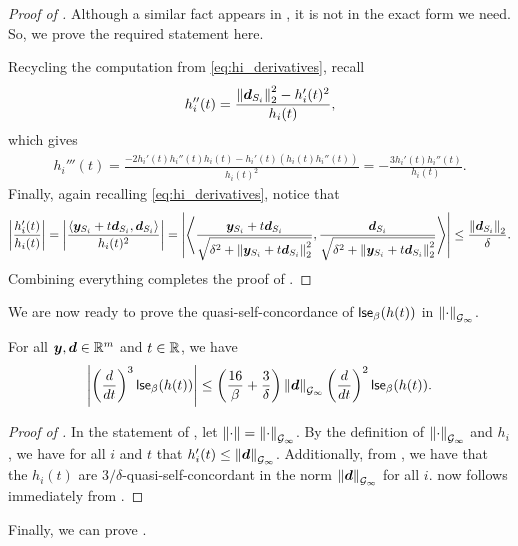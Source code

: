 \begin{proof}[Proof of ]
Although a similar fact appears in \cite[Section 2.1.2]{ob18}, it is not in the exact form we need. So, we prove the required statement here.

Recycling the computation from \eqref{eq:hi_derivatives}, recall
\begin{align*}
    h_i''(t) = \frac{\left\lVert \bm{d}_{S_i} \right\rVert_2^2 - h_i'(t)^2}{h_i(t)},
\end{align*}
which gives
\begin{align*}
    h_i'''(t) = \frac{-2h_i'(t)h_i''(t)h_i(t) - h_i'(t)(h_i(t)h_i''(t))}{h_i(t)^2} = -\frac{3h_i'(t)h_i''(t)}{h_i(t)}.
\end{align*}
Finally, again recalling \eqref{eq:hi_derivatives}, notice that
\begin{align*}
    \left\lvert \frac{h_i'(t)}{h_i(t)} \right\rvert = \left\lvert \frac{\left\langle \bm{y}_{S_i}+t\bm{d}_{S_i},\bm{d}_{S_i} \right\rangle}{h_i(t)^2} \right\rvert = \left\lvert \left\langle \frac{\bm{y}_{S_i}+t\bm{d}_{S_i}}{\sqrt{\delta^2+\left\lVert \bm{y}_{S_i}+t\bm{d}_{S_i} \right\rVert_2^2}}, \frac{\bm{d}_{S_i}}{\sqrt{\delta^2+\left\lVert \bm{y}_{S_i}+t\bm{d}_{S_i} \right\rVert_2^2}} \right\rangle \right\rvert \le \frac{\left\lVert \bm{d}_{S_i} \right\rVert_2}{\delta}.
\end{align*}
Combining everything completes the proof of .
\end{proof}
We are now ready to prove the quasi-self-concordance of $\mathsf{lse}_{\beta}(h(t))$ in $\left\lVert \cdot \right\rVert_{\mathcal{G}_{\infty}}$.
\begin{lemma}
\label{lemma:base_qsc}
For all $\bm{y}, \bm{d} \in \mathbb{R}^m$ and $t\in\mathbb{R}$, we have
\begin{align*}
    \left\lvert \left(\frac{d}{dt}\right)^3 \mathsf{lse}_{\beta}(h(t)) \right\rvert \le \left(\frac{16}{\beta}+\frac{3}{\delta}\right)\left\lVert \bm{d} \right\rVert_{\mathcal{G}_{\infty}}\left(\frac{d}{dt}\right)^2 \mathsf{lse}_{\beta}(h(t)).
\end{align*}
\end{lemma}
\begin{proof}[Proof of ]
In the statement of , let $\left\lVert \cdot \right\rVert = \left\lVert \cdot \right\rVert_{\mathcal{G}_{\infty}}$. By the definition of $\left\lVert \cdot \right\rVert_{\mathcal{G}_{\infty}}$ and $h_i$, we have for all $i$ and $t$ that $h_i'(t) \le \left\lVert \bm{d} \right\rVert_{\mathcal{G}_{\infty}}$. Additionally, from , we have that the $h_i(t)$ are $3/\delta$-quasi-self-concordant in the norm $\left\lVert \bm{d} \right\rVert_{\mathcal{G}_{\infty}}$ for all $i$.  now follows immediately from .
\end{proof}
Finally, we can prove .
